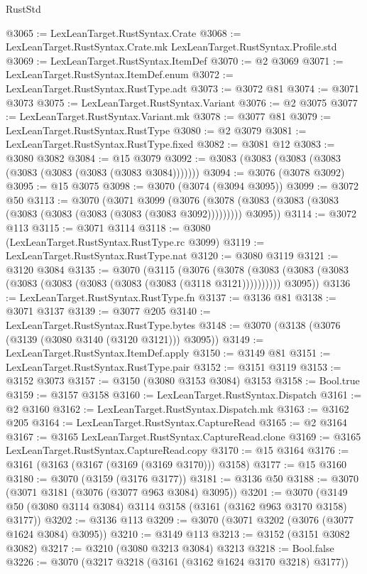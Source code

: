 \begin{lexlean}{RustStd}
\begin{coremodule}
{\begin{coremodule}
{{{{{{{{{{{{{{{{{{{{{{{{{{{{{{{{{{{{{{{@3065 := LexLeanTarget.RustSyntax.Crate
@3068 := LexLeanTarget.RustSyntax.Crate.mk LexLeanTarget.RustSyntax.Profile.std
@3069 := LexLeanTarget.RustSyntax.ItemDef
@3070 := @2 @3069
@3071 := LexLeanTarget.RustSyntax.ItemDef.enum
@3072 := LexLeanTarget.RustSyntax.RustType.adt
@3073 := @3072 @81
@3074 := @3071 @3073
@3075 := LexLeanTarget.RustSyntax.Variant
@3076 := @2 @3075
@3077 := LexLeanTarget.RustSyntax.Variant.mk
@3078 := @3077 @81
@3079 := LexLeanTarget.RustSyntax.RustType
@3080 := @2 @3079
@3081 := LexLeanTarget.RustSyntax.RustType.fixed
@3082 := @3081 @12
@3083 := @3080 @3082
@3084 := @15 @3079
@3092 := @3083 (@3083 (@3083 (@3083 (@3083 (@3083 (@3083 (@3083 @3084)))))))
@3094 := @3076 (@3078 @3092)
@3095 := @15 @3075
@3098 := @3070 (@3074 (@3094 @3095))
@3099 := @3072 @50
@3113 := @3070
    (@3071
      @3099
      (@3076 (@3078 (@3083 (@3083 (@3083 (@3083 (@3083 (@3083 (@3083 (@3083 @3092))))))))) @3095))
@3114 := @3072 @113
@3115 := @3071 @3114
@3118 := @3080 (LexLeanTarget.RustSyntax.RustType.rc @3099)
@3119 := LexLeanTarget.RustSyntax.RustType.nat
@3120 := @3080 @3119
@3121 := @3120 @3084
@3135 := @3070
    (@3115
      (@3076
        (@3078 (@3083 (@3083 (@3083 (@3083 (@3083 (@3083 (@3083 (@3083 (@3118 @3121))))))))))
        @3095))
@3136 := LexLeanTarget.RustSyntax.RustType.fn
@3137 := @3136 @81
@3138 := @3071 @3137
@3139 := @3077 @205
@3140 := LexLeanTarget.RustSyntax.RustType.bytes
@3148 := @3070 (@3138 (@3076 (@3139 (@3080 @3140 (@3120 @3121))) @3095))
@3149 := LexLeanTarget.RustSyntax.ItemDef.apply
@3150 := @3149 @81
@3151 := LexLeanTarget.RustSyntax.RustType.pair
@3152 := @3151 @3119
@3153 := @3152 @3073
@3157 := @3150 (@3080 @3153 @3084) @3153
@3158 := Bool.true
@3159 := @3157 @3158
@3160 := LexLeanTarget.RustSyntax.Dispatch
@3161 := @2 @3160
@3162 := LexLeanTarget.RustSyntax.Dispatch.mk
@3163 := @3162 @205
@3164 := LexLeanTarget.RustSyntax.CaptureRead
@3165 := @2 @3164
@3167 := @3165 LexLeanTarget.RustSyntax.CaptureRead.clone
@3169 := @3165 LexLeanTarget.RustSyntax.CaptureRead.copy
@3170 := @15 @3164
@3176 := @3161 (@3163 (@3167 (@3169 (@3169 @3170))) @3158)
@3177 := @15 @3160
@3180 := @3070 (@3159 (@3176 @3177))
@3181 := @3136 @50
@3188 := @3070 (@3071 @3181 (@3076 (@3077 @963 @3084) @3095))
@3201 := @3070 (@3149 @50 (@3080 @3114 @3084) @3114 @3158 (@3161 (@3162 @963 @3170 @3158) @3177))
@3202 := @3136 @113
@3209 := @3070 (@3071 @3202 (@3076 (@3077 @1624 @3084) @3095))
@3210 := @3149 @113
@3213 := @3152 (@3151 @3082 @3082)
@3217 := @3210 (@3080 @3213 @3084) @3213
@3218 := Bool.false
@3226 := @3070 (@3217 @3218 (@3161 (@3162 @1624 @3170 @3218) @3177))
}}}}}}}}}}}}}}}}}}}}}}}}}}}}}}}}}}}}}}}
\end{coremodule}}
\end{coremodule}
\end{lexlean}
